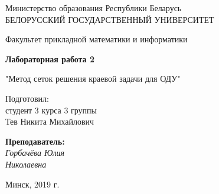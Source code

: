 \documentclass{article}%
\begin{document}
%

\begin{titlepage}
  \begin{center}
    \large
    Министерство образования Республики Беларусь\\
    \vspace{0.5cm}
    БЕЛОРУССКИЙ ГОСУДАРСТВЕННЫЙ УНИВЕРСИТЕТ
    \vspace{0.5cm}
     
    Факультет прикладной математики и информатики
\bigskip
\vfill
\vfill
\vfill
\vfill
\centerline{\Large \bf Лабораторная работа 2}
    \vspace{0.5cm}
\centerline{"Метод сеток решения краевой задачи для ОДУ"}
\end{center}

\vspace*{\fill}
\vfill
\vfill
\vfill
\hfill
\begin{minipage}{0.25\textwidth}
{   Подготовил:\\ студент 3 курса 3 группы\\ Тев Никита Михайлович\\}
\end{minipage}

\mbox{}
\vfill
\hfill
\begin{minipage}{0.25\textwidth}
  {\large{\bf Преподаватель: } 
{\it\\ Горбачёва Юлия \\ Николаевна}}
\end{minipage}

\vspace*{\fill}
\vfill
\vfill
\vfill
\vfill
\vfill
\vfill
\vfill
\vfill
\vfill
\vspace*{\fill}
\begin{center}
Минск, 2019 г.
\end{center}
\end{titlepage}
\end{document}
